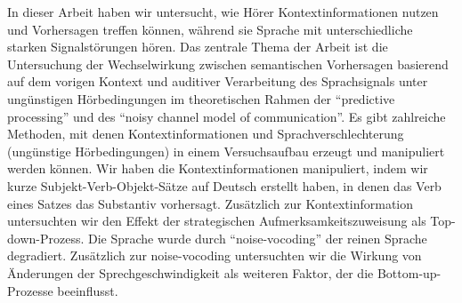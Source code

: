 \documentclass[a4paper, nobind]{templates/ociamthesis}
\begin{document}
\begin{romanpages}
\begin{abstractsecond}
In dieser Arbeit haben wir untersucht, wie Hörer Kontextinformationen nutzen und Vorhersagen treffen können, während sie Sprache mit unterschiedliche starken Signalstörungen hören. Das zentrale Thema der Arbeit ist die Untersuchung der Wechselwirkung zwischen semantischen Vorhersagen basierend auf dem vorigen Kontext und auditiver Verarbeitung des Sprachsignals unter ungünstigen Hörbedingungen im theoretischen Rahmen der ``predictive processing'' und des ``noisy channel model of communication''. Es gibt zahlreiche Methoden, mit denen Kontextinformationen und Sprachverschlechterung (ungünstige Hörbedingungen) in einem Versuchsaufbau erzeugt und manipuliert werden können. Wir haben die Kontextinformationen manipuliert, indem wir kurze Subjekt-Verb-Objekt-Sätze auf Deutsch erstellt haben, in denen das Verb eines Satzes das Substantiv vorhersagt. Zusätzlich zur Kontextinformation untersuchten wir den Effekt der strategischen Aufmerksamkeitszuweisung als Top-down-Prozess. Die Sprache wurde durch ``noise-vocoding'' der reinen Sprache degradiert. Zusätzlich zur noise-vocoding untersuchten wir die Wirkung von Änderungen der Sprechgeschwindigkeit als weiteren Faktor, der die Bottom-up-Prozesse beeinflusst.


\end{abstractsecond}
\end{romanpages}
\end{document}
